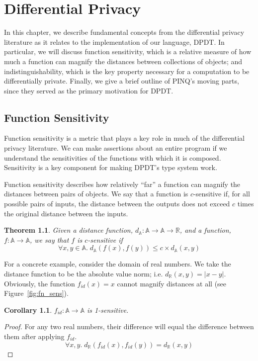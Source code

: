 \documentclass[12pt]{report}
\newtheorem{thm}[defn]{Theorem}
\newtheorem{cor}[defn]{Corollary}
\begin{document}
\chapter{Differential Privacy}\label{sec:differential_privacy}

In this chapter, we describe fundamental concepts from the differential privacy literature as it relates to the implementation of our language, DPDT.
In particular, we will discuss function sensitivity, which is a relative measure of how much a function can magnify the distances between collections of objects; and indistinguishability, which is the key property necessary for a computation to be differentially private.
Finally, we give a brief outline of PINQ's moving parts, since they served as the primary motivation for DPDT.

\section{Function Sensitivity}\label{subsec:fn_sens}

Function sensitivity is a metric that plays a key role in much of the differential privacy literature.
We can make assertions about an entire program if we understand the sensitivities of the functions with which it is composed.
Sensitivity is a key component for making DPDT's type system work.

Function sensitivity describes how relatively ``far'' a function can magnify the distances between pairs of objects.
We say that a function is $c$-sensitive if, for all possible pairs of inputs, the distance between the outputs does not exceed $c$ times the original distance between the inputs.

\begin{thm}\label{thm:csens}
  Given a distance function, $d_{\mathbb A} : \mathbb A \rightarrow \mathbb A \rightarrow \mathbb R$, and a function, $f : \mathbb A \rightarrow \mathbb A$, we say that $f$ is $c$-sensitive if
  $$\forall x,y\in\mathbb A.\; d_{\mathbb A}(f(x),f(y)) \le c \times d_{\mathbb A}(x,y)$$
\end{thm}

\begin{samepage}
For a concrete example, consider the domain of real numbers.
We take the distance function to be the absolute value norm; i.e. $d_\mathbb{R}(x,y) = |x - y|$.
Obviously, the function $f_{id}(x)=x$ cannot magnify distances at all (see Figure~\ref{fig:fn_sens}).
\begin{cor}
$f_{id} : \mathbb A \rightarrow \mathbb A$ is 1-sensitive.
\end{cor}
\begin{proof}
For any two real numbers, their difference will equal the difference between them after applying $f_{id}$.
\nopagebreak
\[
  \forall x,y.\; d_\mathbb{R}(f_{id}(x),f_{id}(y)) = d_\mathbb{R}(x,y)
\]
\end{proof}
\end{samepage}
\end{document}
